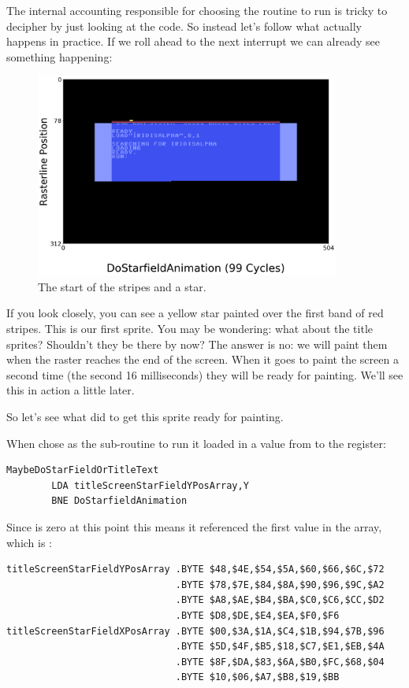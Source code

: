 The internal accounting responsible for choosing the routine to run is tricky to decipher by just looking at the code. So
instead let's follow what actually happens in practice. If we roll ahead to the next interrupt we can already see something
happening:

\begin{figure}[H]
    \centering
      \includegraphics[width=10cm]{titlescreen/title3.png}%
\caption{The start of the stripes and a star.}
\end{figure}

If you look closely, you can see a yellow star painted over the first band of red stripes. This is our first sprite. You may
be wondering: what about the title sprites? Shouldn't they be there by now? The answer is no: we will paint them when the
raster reaches the end of the screen. When it goes to paint the screen a second time (the second 16 milliseconds) they
will be ready for painting. We'll see this in action a little later.

So let's see what  did to get this sprite ready for painting.

When  chose  as the sub-routine to run it loaded in a value
from  to the  register: 

\begin{lstlisting}
MaybeDoStarFieldOrTitleText   
        LDA titleScreenStarFieldYPosArray,Y
        BNE DoStarfieldAnimation
\end{lstlisting}

Since  is zero at this point this means it referenced the first value in the array, which is :
\begin{lstlisting}[basicstyle=\tiny]
titleScreenStarFieldYPosArray .BYTE $48,$4E,$54,$5A,$60,$66,$6C,$72
                              .BYTE $78,$7E,$84,$8A,$90,$96,$9C,$A2
                              .BYTE $A8,$AE,$B4,$BA,$C0,$C6,$CC,$D2
                              .BYTE $D8,$DE,$E4,$EA,$F0,$F6
titleScreenStarFieldXPosArray .BYTE $00,$3A,$1A,$C4,$1B,$94,$7B,$96
                              .BYTE $5D,$4F,$B5,$18,$C7,$E1,$EB,$4A
                              .BYTE $8F,$DA,$83,$6A,$B0,$FC,$68,$04
                              .BYTE $10,$06,$A7,$B8,$19,$BB
\end{lstlisting}

